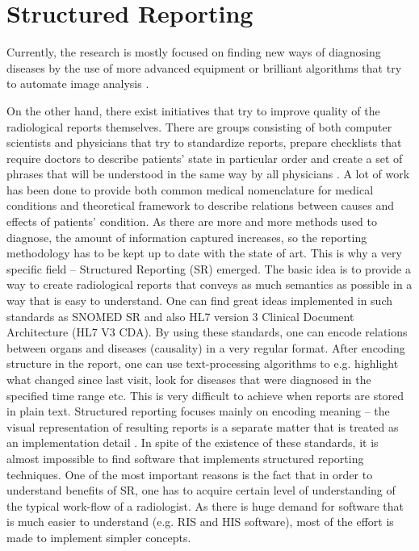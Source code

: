 \documentclass[12pt, twoside, openany]{report}
\theoremstyle{definition}
\begin{document}
\section{Structured Reporting}
Currently, the research is mostly focused on finding new ways of diagnosing diseases by the use of more advanced equipment or brilliant algorithms that try to automate image analysis \cite{ai}. 

On the other hand, there exist initiatives that try to improve quality of the radiological reports themselves. There are groups consisting of both computer scientists and physicians that try to standardize reports, prepare checklists that require doctors to describe patients' state in particular order and create a set of phrases that will be understood in the same way by all physicians \cite{snomed}. A lot of work has been done to provide both common medical nomenclature for medical conditions and theoretical framework to describe relations between causes and effects of patients' condition. As there are more and more methods used to diagnose, the amount of information captured increases, so the reporting methodology has to be kept up to date with the state of art. This is why a very specific field -- Structured Reporting (SR) emerged. The basic idea is to provide a way to create radiological reports that conveys as much semantics as possible in a way that is easy to understand. One can find great ideas implemented in such standards as SNOMED SR \cite{sr} and also HL7 version 3 Clinical Document Architecture (HL7 V3 CDA). By using these standards, one can encode relations between organs and diseases (causality) in a very regular format. After encoding structure in the report, one can use text-processing algorithms to e.g. highlight what changed since last visit, look for diseases that were diagnosed in the specified time range etc. This is very difficult to achieve when reports are stored in plain text. Structured reporting focuses mainly on encoding meaning -- the visual representation of resulting reports is a separate matter that is treated as an implementation detail \cite{sr}.
In spite of the existence of these standards, it is almost impossible to find software that implements structured reporting techniques. One of the most important reasons is the fact that in order to understand benefits of SR, one has to acquire certain level of understanding of the typical work-flow of a radiologist. As there is huge demand for software that is much easier to understand (e.g. RIS and HIS software), most of the effort is made to implement simpler concepts.
\end{document}
